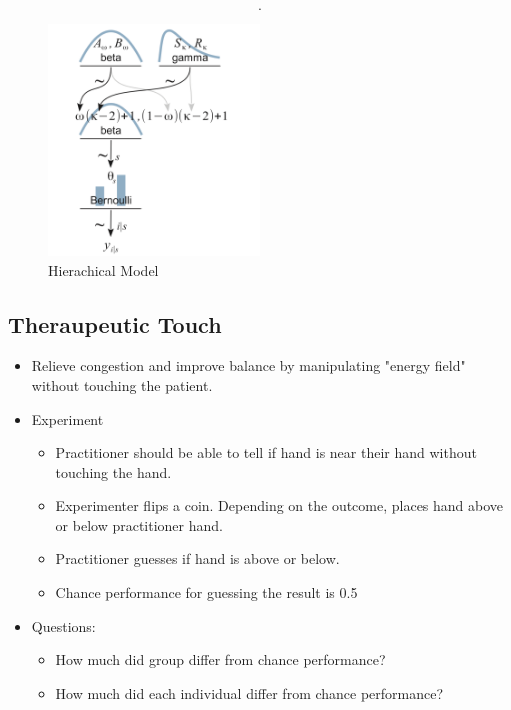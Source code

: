 \documentclass{article}
\begin{document}
\begin{itemize}
\[        .\] 
        \begin{figure}[H]
            \centering
            \includegraphics[width=0.5\textwidth]{model}
            \caption{Hierachical Model}
            \label{fig:}
        \end{figure} 
\end{itemize}
\subsection{Theraupeutic Touch}
\begin{itemize}
    \item Relieve congestion and improve balance by manipulating "energy field" without touching the patient.
    \item Experiment
        \begin{itemize}
            \item Practitioner should be able to tell if hand is near their hand without touching the hand.
            \item Experimenter flips a coin. Depending on the outcome, places hand above or below practitioner hand.
            \item Practitioner guesses if hand is above or below.
            \item Chance performance for guessing the result is 0.5
        \end{itemize}
    \item Questions:
        \begin{itemize}
            \item How much did group differ from chance performance?
            \item How much did each individual differ from chance performance?
        \end{itemize}
\end{itemize}
\end{document}
